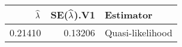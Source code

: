 \begin{table}[ht]
\centering
\begin{tabular}{rrl}
  \hline
$\widehat{\lambda}$ & SE($\widehat{\lambda}$).V1 & Estimator \\ 
  \hline
0.21410 & 0.13206 & Quasi-likelihood \\ 
   \hline
\end{tabular}
\end{table}
